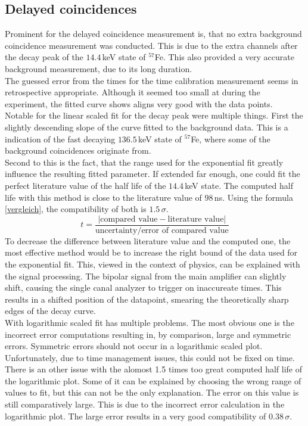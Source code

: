 \documentclass[30pt,a4paper]{article}
\begin{document}
 	\subsection{Delayed coincidences}
 	Prominent for the delayed coincidence measurement is, that no extra background 
 	coincidence measurement was conducted. This is due to the extra channels after the 
 	decay peak of the $14.4$\,keV state of $^{57}$Fe. This also provided a very accurate
 	background measurement, due to its long duration.\\
 	The guessed error from the times for the time calibration measurement seems in
 	retrospective appropriate. Although it seemed too small at during the experiment,
 	the fitted curve shows aligns very good with the data points.\\
 	Notable for the linear scaled fit for the decay peak were multiple things.
 	First the slightly descending slope of the curve fitted to the background data.
 	This is a indication of the fast decaying $136.5$\,keV state of $^{57}$Fe, where
 	some of the background coincidences originate from.\\
 	Second to this is the fact, that the range used for the exponential fit greatly
 	influence the resulting fitted parameter. If extended far enough, one could fit the
 	perfect literature value of the half life of the $14.4$\,keV state. The computed
 	half life with this method is close to the literature value of $98\,$ns. Using the 
 	formula \ref{vergleich}, the compatibility of both is $1.5\,\sigma$.
 	\begin{equation}
 		t = \frac{\left|\textrm{compared value}-\textrm{literature value}\right|}{\textrm{uncertainty/error of compared value}}
 		\label{vergleich}
 	\end{equation}
 	To decrease the difference between literature value and the computed one, the most effective method would be to increase the right bound of the data used for the exponential fit. This, viewed in the context of physics, can be	explained with the signal processing. The bipolar signal from the main amplifier can slightly shift, causing the single canal analyzer to trigger on inaccureate times. This results in a shifted position of the datapoint, smearing the theoretically 	sharp edges of the decay curve.\\
 	
 	
 	With logarithmic scaled fit has multiple problems. The most obvious one is 	the incorrect error computations resulting in, by comparison, large and symmetric errors. Symmetric errors should not occur in a logarithmic scaled plot. 
 	Unfortunately, due to  time management issues, this could not be fixed on time.
 	There is an other issue with the alomost 1.5 times too great computed half life of the logarithmic plot. Some of it can be explained by choosing the wrong range of values to fit, but this can not be the only explanation. The error on this value is still comparatively large. This is due to the incorrect error calculation in the logarithmic plot. The large error results in a very good compatibility of $0.38\,\sigma$. 
\end{document}
